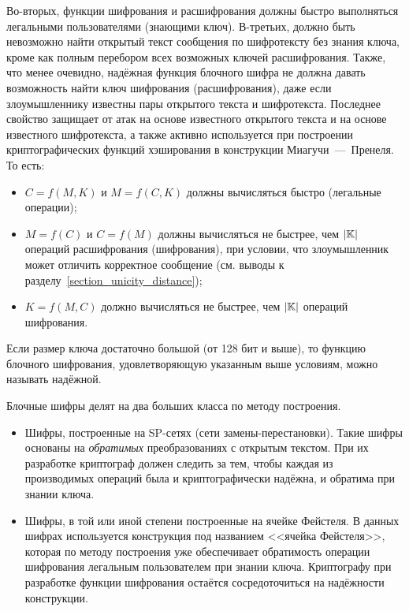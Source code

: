 Во-вторых, функции шифрования и расшифрования должны быстро выполняться легальными пользователями (знающими ключ). В-третьих, должно быть невозможно найти открытый текст сообщения по шифротексту без знания ключа, кроме как полным перебором всех возможных ключей расшифрования. Также, что менее очевидно, надёжная функция блочного шифра не должна давать возможность найти ключ шифрования (расшифрования), даже если злоумышленнику известны пары открытого текста и шифротекста. Последнее свойство защищает от атак на основе известного открытого текста и на основе известного шифротекста, а также активно используется при построении криптографических функций хэширования в конструкции Миагучи~---~Пренеля. То есть:
\begin{itemize}
	\item $C = f \left( M, K \right)$ и $M = f \left( C, K \right)$ должны вычисляться быстро (легальные операции);
	\item $M = f \left( C \right)$ и $C = f \left( M \right)$ должны вычисляться не быстрее, чем $\left| \mathbb{K} \right|$ операций расшифрования (шифрования), при условии, что злоумышленник может отличить корректное сообщение (см. выводы к разделу~\ref{section_unicity_distance});
	\item $K = f \left( M, C \right)$ должно вычисляться не быстрее, чем $\left| \mathbb{K} \right|$ операций шифрования.
\end{itemize}

Если размер ключа достаточно большой (от 128 бит и выше), то функцию блочного шифрования, удовлетворяющую указанным выше условиям, можно называть надёжной.

Блочные шифры делят на два больших класса по методу построения.
\begin{itemize}
	\item Шифры, построенные на SP-сетях (сети замены-пере\-становки). Такие шифры основаны на \emph{обратимых} преобразованиях с открытым текстом. При их разработке криптограф должен следить за тем, чтобы каждая из производимых операций была и криптографически надёжна, и обратима при знании ключа.
	\item Шифры, в той или иной степени построенные на ячейке Фейстеля. В данных шифрах используется конструкция под названием <<ячейка Фейстеля>>, которая по методу построения уже обеспечивает обратимость операции шифрования легальным пользователем при знании ключа. Криптографу при разработке функции шифрования остаётся сосредоточиться на надёжности конструкции.
\end{itemize}

